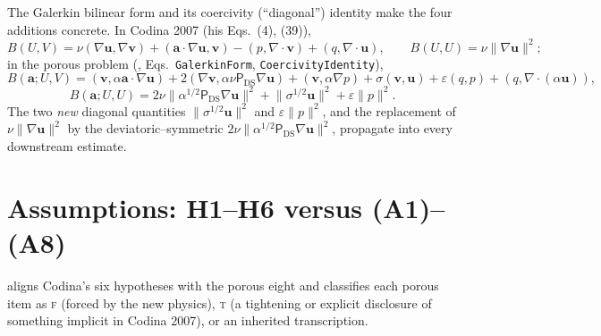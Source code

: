 \documentclass[11pt]{article}
\theoremstyle{remark}
\newcommand{\bu}{\boldsymbol{u}}
\newcommand{\bv}{\boldsymbol{v}}
\newcommand{\ba}{\boldsymbol{a}}
\newcommand{\ViscProj}{\mathsf{P}_{\mathrm{DS}}}
\newcommand{\norm}[1]{\lVert #1 \rVert}
\newcommand{\forced}{\textsc{f}\xspace}   %
\newcommand{\tight}{\textsc{t}\xspace}    %
\begin{document}
The Galerkin bilinear form and its coercivity (``diagonal'') identity make the four
additions concrete. In Codina 2007 (his Eqs.~(4), (39)),
\[
  B(U,V)=\nu(\nabla\bu,\nabla\bv)+(\ba\cdot\nabla\bu,\bv)-(p,\nabla\cdot\bv)+(q,\nabla\cdot\bu),
  \qquad
  B(U,U)=\nu\norm{\nabla\bu}^2;
\]
in the porous problem (\cite{osgsnote}, Eqs.~\texttt{GalerkinForm}, \texttt{CoercivityIdentity}),
\[
  B(\ba;U,V)=(\bv,\alpha\ba\cdot\nabla\bu)+2(\nabla\bv,\alpha\nu\ViscProj\nabla\bu)
  +(\bv,\alpha\nabla p)+\sigma(\bv,\bu)+\varepsilon(q,p)+(q,\nabla\cdot(\alpha\bu)),
\]
\[
  B(\ba;U,U)=2\nu\norm{\alpha^{1/2}\ViscProj\nabla\bu}^2+\norm{\sigma^{1/2}\bu}^2+\varepsilon\norm{p}^2 .
\]
The two \emph{new} diagonal quantities $\norm{\sigma^{1/2}\bu}^2$ and
$\varepsilon\norm{p}^2$, and the replacement of $\nu\norm{\nabla\bu}^2$ by the
deviatoric--symmetric $2\nu\norm{\alpha^{1/2}\ViscProj\nabla\bu}^2$, propagate into every
downstream estimate.

\section{Assumptions: H1--H6 versus (A1)--(A8)}
\label{sec:assumptions}

 aligns Codina's six hypotheses with the porous eight and classifies
each porous item as \forced{} (forced by the new physics), \tight{} (a tightening or
explicit disclosure of something implicit in Codina 2007), or an inherited transcription.
\end{document}
